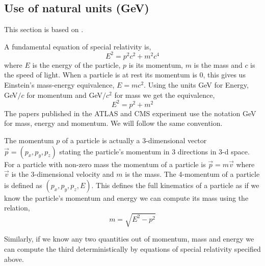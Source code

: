 
\begin{appendices}

\renewcommand{\thesection}{\Alph{section}}

\section{Use of natural units (GeV)}

\label{App}

This section is based on \cite{rm}.

A fundamental equation of special relativity is, $$ E^2 = p^2c^2 + m^2c^4 $$ where $E$ is the energy of the particle, $p$ is its momentum, $m$ is the mass and $c$ is the speed of light. When a particle is at rest its momentum is 0, this gives us Einstein's mass-energy equivalence, $E = mc^2$.  Using the units GeV for Energy, GeV$/c$ for momentum and GeV$/c^2$ for mass we get the equivalence,  $$E^2 = p^2 + m^2 $$ The papers published in the ATLAS and CMS experiment use the notation GeV for mass, energy and momentum. We will follow the same convention.

The momentum $p$ of a particle is actually a 3-dimensional vector $\overrightarrow{p} = (p_{x}, p_{y}, p_{z})$ stating the particle's momentum in 3 directions in 3-d space. For a particle with non-zero mass the momentum of a particle is $\overrightarrow{p} = m\overrightarrow{v}$ where $\overrightarrow{v}$ is the 3-dimensional velocity and $m$ is the mass. The 4-momentum of a particle is defined as $(p_{x}, p_{y}, p_{z}, E)$. This defines the full kinematics of a particle as if we know the particle's momentum and energy we can compute its mass using the relation, $$ m = \sqrt{E^2 - p^2} $$

Similarly, if we know any two quantities out of momentum, mass and energy we can compute the third deterministically by equations of special relativity specified above. 

\clearpage

\end{appendices}